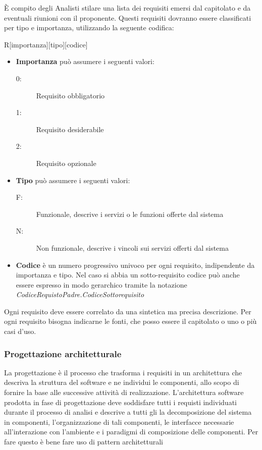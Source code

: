 \documentclass[12pt,a4paper]{article}
\begin{document}
È compito degli Analisti stilare una lista dei requisiti emersi dal capitolato e da eventuali riunioni con il proponente. Questi requisiti dovranno essere classificati per tipo e importanza, utilizzando la seguente codifica:
\begin{center}
	R[importanza][tipo][codice]
\end{center}
\begin{itemize}
	\item \textbf{Importanza} può assumere i seguenti valori:
	\begin{description}
		\item[0:] Requisito obbligatorio
		\item[1:] Requisito desiderabile
		\item[2:] Requisito opzionale
	\end{description}
\end{itemize}
\begin{itemize}
	\item \textbf{Tipo} può assumere i seguenti valori:
	\begin{description}
		\item[F:] Funzionale, descrive i servizi o le funzioni offerte dal sistema
		\item[N:] Non funzionale, descrive i vincoli sui servizi offerti dal sistema
	\end{description}
\end{itemize}
\begin{itemize}
	\item \textbf{Codice} è un numero progressivo univoco per ogni requisito, indipendente da importanza e tipo. Nel caso si abbia un sotto-requisito codice può anche essere espresso in modo gerarchico tramite la notazione \textit{CodiceRequistoPadre.CodiceSottorequisito}
\end{itemize}
Ogni requisito deve essere correlato da una sintetica ma precisa descrizione. Per ogni requisito bisogna indicarne le fonti, che posso essere il capitolato o uno o più casi d'uso.


\subsubsection{Progettazione architetturale}
La progettazione è il processo che trasforma i requisiti in un architettura che descriva la struttura del software e ne individui le componenti, allo scopo di fornire la base alle successive attività di realizzazione. L'architettura software prodotta in fase di progettazione deve soddisfare tutti i requisti individuati durante il processo di analisi e descrive a tutti gli  la decomposizione del sistema in componenti, l'organizzazione di tali componenti, le interfacce necessarie all'interazione con l'ambiente e i paradigmi di composizione delle componenti. Per fare questo è bene fare uso di pattern architetturali
\end{document}
